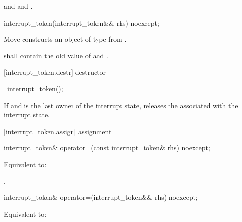 {\begin{itemdescr}
  \pnum\postconditions {}
                and 
                and .
\end{itemdescr}

%
\begin{itemdecl}
interrupt_token(interrupt_token&& rhs) noexcept;
\end{itemdecl}
\begin{itemdescr}
  \pnum\effects Move constructs an object of type  from .

  \pnum\postconditions {} shall contain the old value of  and
                        .
\end{itemdescr}

[interrupt_token.destr]{ destructor}

%
\begin{itemdecl}
~interrupt_token();
\end{itemdecl}

\begin{itemdescr}
 \pnum\effects If  and  is the last owner of the interrupt state,
                releases the associated with the interrupt state.
\end{itemdescr}

[interrupt_token.assign]{ assignment}

%
\begin{itemdecl}
interrupt_token& operator=(const interrupt_token& rhs) noexcept;
\end{itemdecl}
\begin{itemdescr}
  \pnum\effects Equivalent to: 

  \pnum\returns {}.
\end{itemdescr}

%
\begin{itemdecl}
interrupt_token& operator=(interrupt_token&& rhs) noexcept;
\end{itemdecl}
\begin{itemdescr}
  \pnum\effects Equivalent to: 


\end{itemdescr}}
